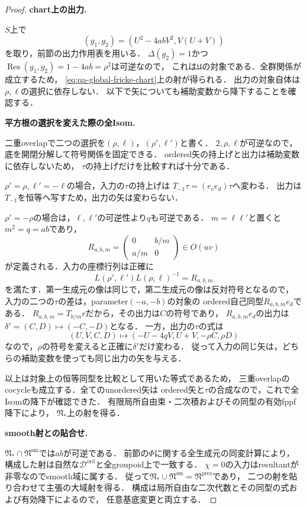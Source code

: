 \begin{proof}
\par\medskip\noindent\textbf{chart上の出力.}\par\nobreak\smallskip
$S$上で
\[
 (g_1,g_2)=(U^2-4abV^2,V(U+V))
\]
を取り，前節の出力作用表を用いる．
$\Delta(g_2)=1$かつ$\operatorname{Res}(g_1,g_2)=1-4ab=\rho^2$は可逆なので，
これは$\mathfrak U$の対象である．全群関係が成立するため，
\eqref{eq:qa-global-fricke-chart}上の射が得られる．
出力の対象自体は$\rho,\ell$の選択に依存しない．
以下で矢についても補助変数から降下することを確認する．

\par\medskip\noindent\textbf{平方根の選択を変えた際の全Isom.}\par\nobreak\smallskip
二重overlapで二つの選択を$(\rho,\ell)$，$(\rho',\ell')$と書く．
$2,\rho,\ell$が可逆なので，底を開閉分解して符号関係を固定できる．
ordered矢の持上げと出力は補助変数に依存しないため，
$\tau$の持上げだけを比較すれば十分である．

$\rho'=\rho,\ell'=-\ell$の場合，入力の$\tau$の持上げは
$T_{-1}\tau=(e_ce_d)\tau$へ変わる．
出力は$T_{-1}$を恒等へ写すため，出力の矢は変わらない．

$\rho'=-\rho$の場合は，$\ell,\ell'$の可逆性より$q$も可逆である．
$m=\ell\ell'$と置くと$m^2=q=ab$であり，
\[
 R_{a,b,m}=\begin{pmatrix}0&b/m\\a/m&0\end{pmatrix}\in O(uv)
\]
が定義される．入力の座標行列は正確に
\[
 L(\rho',\ell')L(\rho,\ell)^{-1}=R_{a,b,m}
\]
を満たす．第一生成元の像は同じで，第二生成元の像は反対符号となるので，
入力の二つの$\tau$の差は，parameter$(-a,-b)$の対象の
ordered自己同型$R_{a,b,m}e_d$である．
$R_{a,b,m}=T_{b/m}r$だから，その出力は$C$の符号であり，
$R_{a,b,m}e_d$の出力は$\delta'=(C,D)\mapsto(-C,-D)$となる．
一方，出力の$\tau$の式は
\[
 (U,V,C,D)\longmapsto
 (-U-4qV,U+V,-\rho C,\rho D)
\]
なので，$\rho$の符号を変えると正確に$\delta'$だけ変わる．
従って入力の同じ矢は，どちらの補助変数を使っても同じ出力の矢を与える．

以上は対象上の恒等同型を比較として用いた等式であるため，
三重overlapのcocycleも成立する．全てのunordered矢は
ordered矢と$\tau$の合成なので，これで全Isomの降下が確認できた．
有限局所自由束・二次積およびその同型の有効fppf降下により，
$\mathfrak N_*$上の射を得る．

\par\medskip\noindent\textbf{smooth射との貼合せ.}\par\nobreak\smallskip
$\mathfrak N_*\cap\mathfrak N^{\mathrm{sm}}$では$ab$が可逆である．
前節の$\Phi$に関する全生成元の同変計算により，
構成した射は自然な$\mathscr D^{\mathrm{ord}}$と全groupoid上で一致する．
$\chi=0$の入力はresultantが非零なのでsmooth域に属する．
従って$\mathfrak N_*\cup\mathfrak N^{\mathrm{sm}}=\mathfrak N^{\mathrm{pres}}$であり，
二つの射を貼り合わせて主張の大域射を得る．
構成は局所自由な二次代数とその同型の式および有効降下によるので，
任意基底変更と両立する．
\end{proof}

